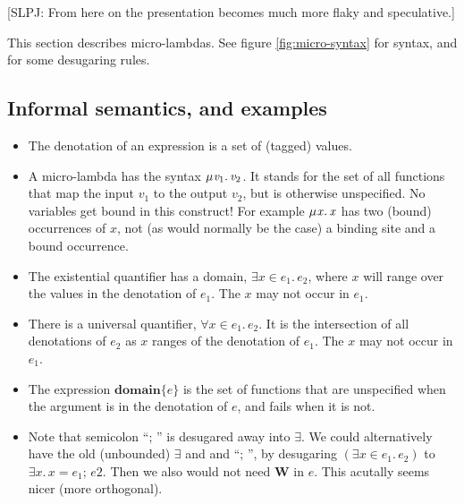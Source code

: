 \documentclass[acmsmall,review,dvipsnames]{acmart}
\newcommand{\Varid}[1]{\mathit{#1}}
\newcommand{\simon}[1]{{\color{dkblue} [{SLPJ}: #1]}}
\newcommand{\simon}[1]{}
\begin{document}
\simon{From here on the presentation becomes much more flaky and speculative.}

This section describes micro-lambdas.  See figure \ref{fig:micro-syntax} for syntax,
and  for some desugaring rules.

\subsection{Informal semantics, and examples}

\begin{itemize}
\item The denotation of an expression is a set of (tagged) values.
\item A micro-lambda has the syntax \ensuremath{\mu\hspace{0.03em}\Varid{v}_{\mathrm{1}}.\,\Varid{v}_{\mathrm{2}}}.  It stands for the set of all
  functions that map the input \ensuremath{\Varid{v}_{\mathrm{1}}} to the output \ensuremath{\Varid{v}_{\mathrm{2}}}, but is otherwise unspecified.
  No variables get bound in this construct! For example \ensuremath{\mu\hspace{0.03em}\Varid{x}.\,\Varid{x}} has two (bound) occurrences of \ensuremath{\Varid{x}},
  not (as would normally be the case) a binding site and a bound occurrence.
\item The existential quantifier has a domain, \ensuremath{\exists\Varid{x}\in\Varid{e}_{\mathrm{1}}.\,\Varid{e}_{\mathrm{2}}}, where \ensuremath{\Varid{x}} will range over
 the values in the denotation of \ensuremath{\Varid{e}_{\mathrm{1}}}.  The \ensuremath{\Varid{x}} may not occur in \ensuremath{\Varid{e}_{\mathrm{1}}}.
\item There is a universal quantifier, \ensuremath{\forall\Varid{x}\in\Varid{e}_{\mathrm{1}}.\,\Varid{e}_{\mathrm{2}}}.  It is the intersection of all
 denotations of \ensuremath{\Varid{e}_{\mathrm{2}}} as \ensuremath{\Varid{x}} ranges of the denotation of \ensuremath{\Varid{e}_{\mathrm{1}}}.  The \ensuremath{\Varid{x}} may not occur in \ensuremath{\Varid{e}_{\mathrm{1}}}.
\item The expression \ensuremath{\textbf{domain}\{\Varid{e}\}} is the set of functions that are unspecified when the argument is
  in the denotation of \ensuremath{\Varid{e}}, and fails when it is not.
\item Note that semicolon ``\ensuremath{;\,}'' is desugared away into $\exists$.
  We could alternatively have the old (unbounded) $\exists$ and and ``\ensuremath{;\,}'', by desugaring
  \ensuremath{(\exists\Varid{x}\in\Varid{e}_{\mathrm{1}}.\,\Varid{e}_{\mathrm{2}})} to \ensuremath{\exists\Varid{x}.\,\Varid{x}\mathrel{=}\Varid{e}_{\mathrm{1}};\,\Varid{e2}}.  Then we also would not need \ensuremath{\textbf{W}} in \ensuremath{\Varid{e}}.  This acutally
  seems nicer (more orthogonal).
\end{itemize}
\end{document}
